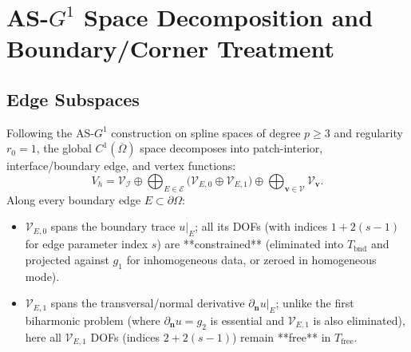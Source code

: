 \documentclass[11pt,a4paper]{article}
\newcommand{\bn}{\mathbf{n}}
\newcommand{\bv}{\mathbf{v}}
\begin{document}
\section{\texorpdfstring{AS-$G^1$}{AS-G1} Space Decomposition and Boundary/Corner Treatment}

\subsection{Edge Subspaces}
Following the AS-$G^1$ construction on spline spaces of degree $p \ge 3$ and regularity $r_0 = 1$, the global $C^1(\overline{\Omega})$ space decomposes into patch-interior, interface/boundary edge, and vertex functions:
\begin{equation}
V_h = \mathcal{V}_{\mathcal{I}} \oplus
\bigoplus_{E \in \mathcal{E}} \bigl( \mathcal{V}_{E,0} \oplus \mathcal{V}_{E,1} \bigr)
\oplus \bigoplus_{\bv \in \mathcal{V}} \mathcal{V}_{\bv}.
\end{equation}
Along every boundary edge $E \subset \partial\Omega$:
\begin{itemize}
    \item $\mathcal{V}_{E,0}$ spans the boundary trace $u|_E$; all its DOFs (with indices $1 + 2(s-1)$ for edge parameter index $s$) are **constrained** (eliminated into $T_{\mathrm{bnd}}$ and projected against $g_1$ for inhomogeneous data, or zeroed in homogeneous mode).
    \item $\mathcal{V}_{E,1}$ spans the transversal/normal derivative $\partial_{\bn} u|_E$; unlike the first biharmonic problem (where $\partial_{\bn} u = g_2$ is essential and $\mathcal{V}_{E,1}$ is also eliminated), here all $\mathcal{V}_{E,1}$ DOFs (indices $2 + 2(s-1)$) remain **free** in $T_{\mathrm{free}}$.
\end{itemize}
\end{document}
